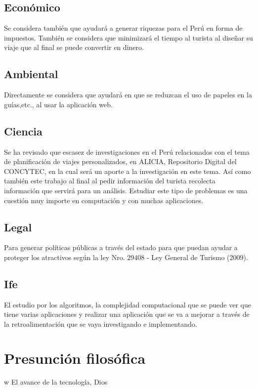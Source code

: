 \subsection{Económico}
Se considera también que ayudará a generar riquezas para el Perú en forma de impuestos. También se considera que minimizará el tiempo al turista al diseñar su viaje que al final se puede convertir en dinero.
\subsection{Ambiental}
Directamente se considera que ayudará en que se reduzcan el uso de papeles en la guías,etc., al usar la aplicación web. 
\subsection{Ciencia}
Se ha revisado que escasez de investigaciones en el Perú relacionados con el tema de planificación de viajes personalizados, en ALICIA, Repositorio Digital del CONCYTEC, en la cual será un aporte a la investigación en este tema. Así como también este trabajo al final al pedir información del turista recolecta información que servirá para un análisis.
Estudiar este tipo de problemas es una cuestión muy importe en computación y con muchas aplicaciones.\cite{Derivando2017QueYouTube}
\subsection{Legal}
Para generar políticas públicas a través del estado para que puedan ayudar a proteger los atractivos según la ley Nro. 29408 - Ley General de Turismo (2009).
\subsection{Ife}
El estudio por los algoritmos, la complejidad computacional que se puede ver que tiene varias aplicaciones y realizar una aplicación que se va a mejorar a través de la retroalimentación que se vaya investigando e implementando. 
\section{Presunción filosófica}
w
El avance de la tecnología, Dios